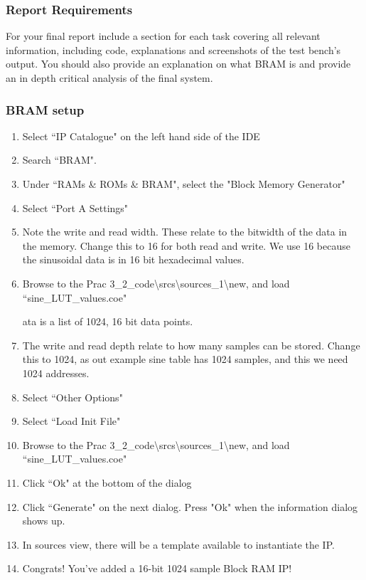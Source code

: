 \subsubsection{Report Requirements}
For your final report include a section for each task covering all relevant information, including code, explanations and screenshots of the test bench's output. You should also provide an explanation on what BRAM is and provide an in depth critical analysis of the final system. 

\subsubsection{BRAM setup}
\begin{enumerate}
    \item Select ``IP Catalogue" on the left hand side of the IDE
    \item Search ``BRAM".
    \item Under ``RAMs \& ROMs \& BRAM", select the "Block Memory Generator"
    \item Select ``Port A Settings"
    \item Note the write and read width. These relate to the bitwidth of the data in the memory. Change this to 16 for both read and write. We use 16 because the sinusoidal data is in 16 bit hexadecimal values.
    \item Browse to the Prac 3\_2\_code\textbackslash srcs\textbackslash sources\_1\textbackslash new, and load ``sine\_LUT\_values.coe"

ata is a list of 1024, 16 bit data points.
    \item The write and read depth relate to how many samples can be stored. Change this to 1024, as out example sine table has 1024 samples, and this we need 1024 addresses.
    \item Select ``Other Options"
    \item Select ``Load Init File"
    \item Browse to the Prac 3\_2\_code\textbackslash srcs\textbackslash sources\_1\textbackslash new, and load ``sine\_LUT\_values.coe"
    \item Click ``Ok" at the bottom of the dialog
    \item Click ``Generate" on the next dialog. Press "Ok" when the information dialog shows up.
    \item In sources view, there will be a template available to instantiate the IP.
    \item Congrats! You've added a 16-bit 1024 sample Block RAM IP!
\end{enumerate}

